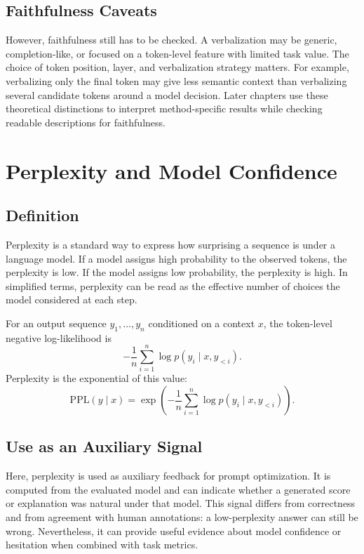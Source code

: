 \documentclass[12pt,a4paper,twoside,openright]{book}
\begin{document}
\subsection{Faithfulness Caveats}

However, faithfulness still has to be checked. A verbalization may be generic,
completion-like, or focused on a token-level feature with limited task value.
The choice of token position, layer, and verbalization strategy matters.
For example, verbalizing only the final token may give less semantic context
than verbalizing several candidate tokens around a model decision. Later
chapters use these theoretical distinctions to interpret method-specific
results while checking readable descriptions for faithfulness.

\section{Perplexity and Model Confidence}

\subsection{Definition}

Perplexity is a standard way to express how surprising a sequence is under a
language model. If a model assigns high probability to the observed tokens, the
perplexity is low. If the model assigns low probability, the perplexity is high.
In simplified terms, perplexity can be read as the effective number of choices
the model considered at each step.

For an output sequence $y_1, \ldots, y_n$ conditioned on a context $x$, the
token-level negative log-likelihood is
\[
    -\frac{1}{n}\sum_{i=1}^{n}\log p(y_i \mid x, y_{<i}).
\]
Perplexity is the exponential of this value:
\[
    \mathrm{PPL}(y \mid x) =
    \exp\left(-\frac{1}{n}\sum_{i=1}^{n}\log p(y_i \mid x, y_{<i})\right).
\]

\subsection{Use as an Auxiliary Signal}

Here, perplexity is used as auxiliary feedback for prompt
optimization. It is computed from the evaluated model and can indicate whether a
generated score or explanation was natural under that model. This signal differs
from correctness and from agreement with human annotations: a low-perplexity
answer can still be wrong. Nevertheless, it can provide useful evidence about
model confidence or hesitation when combined with task metrics.
\end{document}
